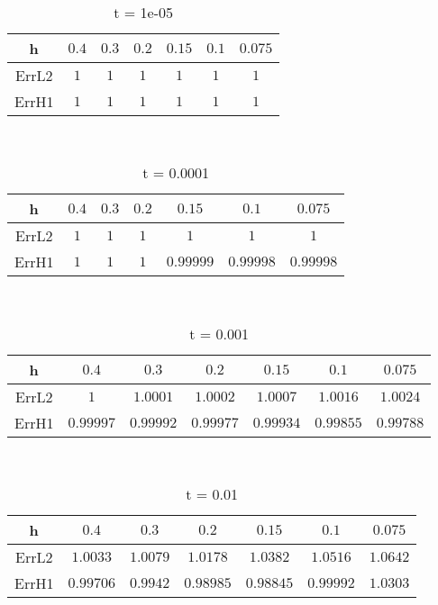 \documentclass{standalone}
\begin{document}
\clearpage
\hfill \\ 
\begin{table}[!h]
\centering
\begin{tabular}{ | c | c | c | c | c | c | c | }
\hline
h	&	$0.4$ & $0.3$ & $0.2$ & $0.15$ & $0.1$ & $0.075$ \\ \hline
ErrL2	&	$1$ & $1$ & $1$ & $1$ & $1$ & $1$ \\ \hline
ErrH1	&	$1$ & $1$ & $1$ & $1$ & $1$ & $1$ \\ \hline
\end{tabular}
\caption{t = 1e-05 }
\end{table}

\hfill \\ 
\begin{table}[!h]
\centering
\begin{tabular}{ | c | c | c | c | c | c | c | }
\hline
h	&	$0.4$ & $0.3$ & $0.2$ & $0.15$ & $0.1$ & $0.075$ \\ \hline
ErrL2	&	$1$ & $1$ & $1$ & $1$ & $1$ & $1$ \\ \hline
ErrH1	&	$1$ & $1$ & $1$ & $0.99999$ & $0.99998$ & $0.99998$ \\ \hline
\end{tabular}
\caption{t = 0.0001 }
\end{table}

\hfill \\ 
\begin{table}[!h]
\centering
\begin{tabular}{ | c | c | c | c | c | c | c | }
\hline
h	&	$0.4$ & $0.3$ & $0.2$ & $0.15$ & $0.1$ & $0.075$ \\ \hline
ErrL2	&	$1$ & $1.0001$ & $1.0002$ & $1.0007$ & $1.0016$ & $1.0024$ \\ \hline
ErrH1	&	$0.99997$ & $0.99992$ & $0.99977$ & $0.99934$ & $0.99855$ & $0.99788$ \\ \hline
\end{tabular}
\caption{t = 0.001 }
\end{table}

\hfill \\ 
\begin{table}[!h]
\centering
\begin{tabular}{ | c | c | c | c | c | c | c | }
\hline
h	&	$0.4$ & $0.3$ & $0.2$ & $0.15$ & $0.1$ & $0.075$ \\ \hline
ErrL2	&	$1.0033$ & $1.0079$ & $1.0178$ & $1.0382$ & $1.0516$ & $1.0642$ \\ \hline
ErrH1	&	$0.99706$ & $0.9942$ & $0.98985$ & $0.98845$ & $0.99992$ & $1.0303$ \\ \hline
\end{tabular}
\caption{t = 0.01 }
\end{table}


\clearpage
\end{document}
